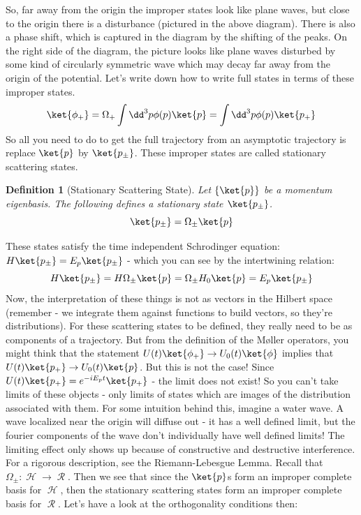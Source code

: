 \documentclass{article}
\DeclareMathOperator{\Hh}{{\mathcal{H}}}
\DeclareMathOperator{\Rr}{{\mathcal{R}}}
\newtheorem{defn}{Definition}
\begin{document}
So, far away from the origin the improper states look like plane waves, but close to the origin there is a disturbance (pictured in the above diagram). There is also a phase shift, which is captured in the diagram by the shifting of the peaks. On the right side of the diagram, the picture looks like plane waves disturbed by some kind of circularly symmetric wave which may decay far away from the origin of the potential. Let's write down how to write full states in terms of these improper states.
\[\ket{\phi_+} = \Omega_+ \int \dd^3 p \phi(p)\ket{p} = \int \dd^3 p \phi(p)\ket{p_+}\]
So all you need to do to get the full trajectory from an asymptotic trajectory is replace $\ket{p}$ by $\ket{p_\pm}$. These improper states are called stationary scattering states.
\begin{defn}[Stationary Scattering State] Let $\{\ket{p}\}$ be a momentum eigenbasis. The following defines a stationary state $\ket{p_\pm}$.
\begin{equation}\ket{p_\pm} = \Omega_\pm \ket{p}\end{equation}
\end{defn}
These states satisfy the time independent Schrodinger equation: $H\ket{p_\pm} = E_p \ket{p_\pm}$ - which you can see by the intertwining relation:
\[H\ket{p_\pm} = H\Omega_\pm\ket{p} = \Omega_{\pm} H_0 \ket{p} = E_p \ket{p_\pm}\]
Now, the interpretation of these things is not as vectors in the Hilbert space (remember - we integrate them against functions to build vectors, so they're distributions). For these scattering states to be defined, they really need to be as components of a trajectory. But from the definition of the M\o ller operators, you might think that the statement $U(t)\ket{\phi_+} \to U_0(t)\ket{\phi}$ implies that $U(t)\ket{p_+} \to U_0(t)\ket{p}$. But this is not the case! Since $U(t)\ket{p_+} = e^{-iE_p t} \ket{p_+}$ - the limit does not exist! So you can't take limits of these objects - only limits of states which are images of the distribution associated with them. For some intuition behind this, imagine a water wave. A wave localized near the origin will diffuse out - it has a well defined limit, but the fourier components of the wave don't individually have well defined limits! The limiting effect only shows up because of constructive and destructive interference. For a rigorous description, see the Riemann-Lebesgue Lemma. Recall that $\Omega_\pm : \Hh \to\Rr$. Then we see that since the $\ket{p}$s form an improper complete basis for $\Hh$, then the stationary scattering states form an improper complete basis for $\Rr$. Let's have a look at the orthogonality conditions then:
\end{document}
